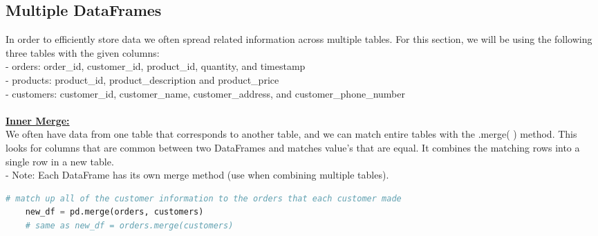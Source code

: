 \documentclass[11pt, a4paper]{article}
\begin{document}
\begin{spacing}{1.1}
	\subsection{Multiple DataFrames}
	In order to efficiently store data we often spread related information across multiple tables. For this section, we will be using the following three tables with the given columns: \vspace*{.5mm} \\
	- orders: order\_id, customer\_id, product\_id, quantity, and timestamp \vspace*{.5mm} \\
	- products: product\_id, product\_description and product\_price\vspace*{.5mm} \\
	- customers: customer\_id, customer\_name, customer\_address, and customer\_phone\_number \\~\\
	\underline{\textbf{Inner Merge:}} \\
	We often have data from one table that corresponds to another table, and we can match entire tables with the .merge( ) method. This looks for columns that are common between two DataFrames and matches value's that are equal. It combines the matching rows into a single row in a new table. \\
	\hspace*{3mm} - Note: Each DataFrame has its own merge method (use when combining multiple tables).
	\begin{lstlisting}[language=Python]
	# match up all of the customer information to the orders that each customer made
	new_df = pd.merge(orders, customers) 
	# same as new_df = orders.merge(customers)
	

\end{lstlisting}
\end{spacing}
\end{document}
